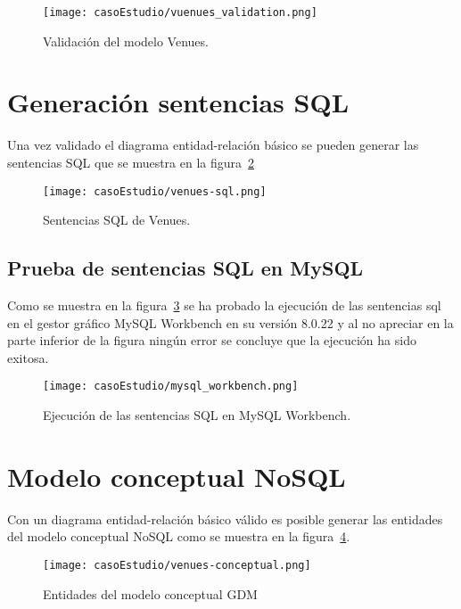  \begin{figure}[H]
  \centering
  \texttt{[image: casoEstudio/vuenues\_validation.png]}
  \caption{Validación del modelo Venues.}
  \label{img:venues_validationER}
\end{figure}

\section{Generación sentencias SQL}
 Una vez validado el diagrama entidad-relación básico se pueden generar las sentencias SQL que se muestra en la figura~\ref{img:venues-sql} 

 \begin{figure}[H]
    \centering
    \texttt{[image: casoEstudio/venues-sql.png]}
    \caption{Sentencias SQL de Venues.}
    \label{img:venues-sql}
\end{figure}

\subsection*{Prueba de sentencias SQL en MySQL}

Como se muestra en la figura~\ref{img:mysql_workbench} se ha probado la ejecución de las sentencias sql en el gestor gráfico MySQL Workbench en su versión 8.0.22 y al no apreciar en la parte inferior de la figura ningún error se concluye que la ejecución ha sido exitosa.

\begin{figure}[H]
  \centering
  \texttt{[image: casoEstudio/mysql\_workbench.png]}
  \caption{Ejecución de las sentencias SQL en MySQL Workbench.}
  \label{img:mysql_workbench}
\end{figure}

\section{Modelo conceptual NoSQL}

Con un diagrama entidad-relación básico válido es posible generar las entidades del modelo conceptual NoSQL como se muestra en la figura~\ref{img:venues-conceptual}.

\begin{figure}[H]
    \centering
    \texttt{[image: casoEstudio/venues-conceptual.png]}
    \caption{Entidades del modelo conceptual GDM}
    \label{img:venues-conceptual}
\end{figure}

